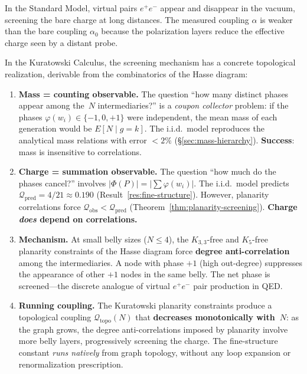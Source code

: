 In the Standard Model, virtual pairs $e^+e^-$ appear and
disappear in the vacuum, screening the bare charge at
long distances. The measured coupling $\alpha$ is weaker than the
bare coupling $\alpha_0$ because the polarization layers
reduce the effective charge seen by a distant probe.

\medskip\noindent
In the Kuratowski Calculus, the screening mechanism has
a concrete topological realization, derivable from the combinatorics
of the Hasse diagram:

\begin{enumerate}
  \item \textbf{Mass = counting observable.} The question ``how many
    distinct phases appear among the~$N$ intermediaries?'' is a
    \emph{coupon collector} problem: if the phases
    $\varphi(w_i) \in \{-1, 0, +1\}$ were independent, the mean
    mass of each generation would be $E[N \mid g = k]$. The
    i.i.d.\ model reproduces the analytical mass relations with error
    $< 2\%$ (\S\ref{sec:mass-hierarchy}).
    \textbf{Success}: mass is insensitive to correlations.

  \item \textbf{Charge = summation observable.} The question ``how much
    do the phases cancel?'' involves $|\Phi(P)| = |\sum \varphi(w_i)|$.
    The i.i.d.\ model predicts
    $\mathcal{Q}_{\mathrm{pred}} = 4/21 \approx 0{.}190$
    (Result~\ref{res:fine-structure}).
    However, planarity correlations force
    $\mathcal{Q}_{\mathrm{obs}} < \mathcal{Q}_{\mathrm{pred}}$
    (Theorem~\ref{thm:planarity-screening}).
    \textbf{Charge \emph{does} depend on correlations.}

  \item \textbf{Mechanism.} At small belly sizes
    ($N \leq 4$), the $K_{3,3}$-free and
    $K_5$-free planarity constraints of the Hasse diagram force
    \textbf{degree anti-correlation} among the intermediaries. A node
    with phase $+1$ (high out-degree) suppresses the appearance of
    other $+1$ nodes in the same belly. The net phase is
    screened---the discrete analogue of virtual $e^+e^-$ pair
    production in QED.

  \item \textbf{Running coupling.}
    The Kuratowski planarity constraints produce a
    topological coupling $\mathcal{Q}_{\mathrm{topo}}(N)$ that
    \textbf{decreases monotonically with~$N$}: as the graph
    grows, the degree anti-correlations imposed by planarity
    involve more belly layers, progressively screening
    the charge. The fine-structure constant \emph{runs natively}
    from graph topology, without any loop expansion or
    renormalization prescription.
\end{enumerate}


